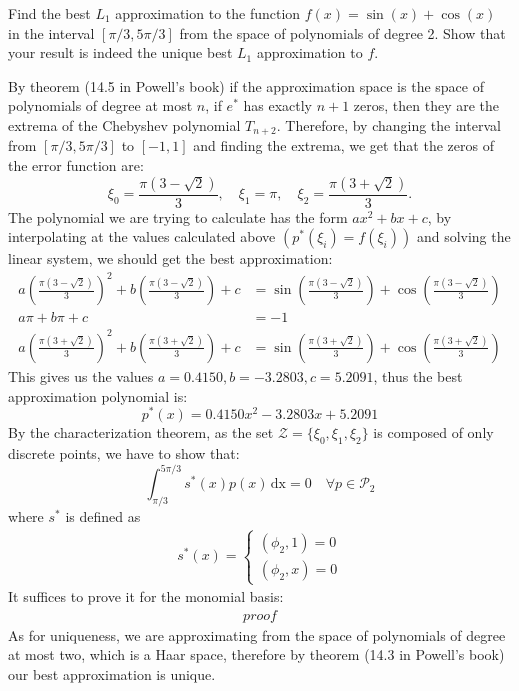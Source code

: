 \begin{problem}
Find the best $L_1$ approximation to the function $f(x) = \sin(x) + \cos(x)$ in the interval $[\pi/3, 5\pi/3]$ from the space of polynomials of degree 2. Show that your result is indeed the unique best $L_1$ approximation to $f$.
\end{problem}

\begin{solution}
By theorem (14.5 in Powell's book) if the approximation space is the space of polynomials of degree at most $n$, if $e^*$ has exactly $n+1$ zeros, then they are the extrema of the Chebyshev polynomial $T_{n+2}$. Therefore, by changing the interval from $[\pi/3, 5\pi/3]$ to $[-1,1]$ and finding the extrema, we get that the zeros of the error function are:
\begin{equation*}
\xi_0 = \frac{\pi(3-\sqrt{2})}{3}, \quad \xi_1 = \pi, \quad \xi_2 = \frac{\pi(3+\sqrt{2})}{3}.
\end{equation*}
The polynomial we are trying to calculate has the form $ax^2+bx+c$, by interpolating at the values calculated above $(p^*(\xi_i) = f(\xi_i))$ and solving the linear system, we should get the best approximation:
\begin{align*}
a\left(\frac{\pi(3-\sqrt{2})}{3}\right)^2+b\left(\frac{\pi(3-\sqrt{2})}{3}\right)+c &= \sin\left(\frac{\pi(3-\sqrt{2})}{3}\right) + \cos\left(\frac{\pi(3-\sqrt{2})}{3}\right) \\
a \pi + b\pi +c &=-1 \\
a\left(\frac{\pi(3+\sqrt{2})}{3}\right)^2 +b\left(\frac{\pi(3+\sqrt{2})}{3}\right) + c &= \sin\left(\frac{\pi(3+\sqrt{2})}{3}\right) + \cos\left(\frac{\pi(3+\sqrt{2})}{3}\right)
\end{align*}
This gives us the values $a=0.4150, b = -3.2803, c = 5.2091$, thus the best approximation polynomial is:
\begin{equation*}
p^*(x)=0.4150x^2 -3.2803x+5.2091
\end{equation*}
By the characterization theorem, as the set $\mathcal{Z} = \{\xi_0, \xi_1, \xi_2 \}$ is composed of only discrete points, we have to show that:
\begin{equation*}
\int_{\pi/3}^{5\pi/3} s^*(x)p(x) \, \text{dx} = 0 \quad \forall p \in \mathcal{P}_2
\end{equation*}
where $s^*$ is defined as
\begin{align*}
s^*(x)=
\begin{cases}
(\phi_2, 1) = 0 \\
(\phi_2, x) = 0
\end{cases}
\end{align*}
It suffices to prove it for the monomial basis:
\begin{align*}
proof
\end{align*}
As for uniqueness, we are approximating from the space of polynomials of degree at most two, which is a Haar space, therefore by theorem (14.3 in Powell's book) our best approximation is unique.
\end{solution}

